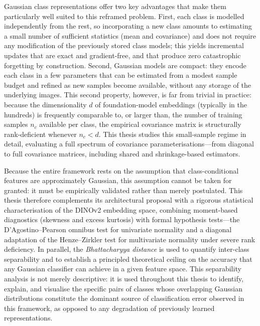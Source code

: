 Gaussian class representations offer two key advantages that make them particularly well suited to this reframed problem. First, each class is modelled independently from the rest, so incorporating a new class amounts to estimating a small number of sufficient statistics (mean and covariance) and does not require any modification of the previously stored class models; this yields incremental updates that are exact and gradient-free, and that produce zero catastrophic forgetting by construction. Second, Gaussian models are compact: they encode each class in a few parameters that can be estimated from a modest sample budget and refined as new samples become available, without any storage of the underlying images. This second property, however, is far from trivial in practice: because the dimensionality $d$ of foundation-model embeddings (typically in the hundreds) is frequently comparable to, or larger than, the number of training samples $n_c$ available per class, the empirical covariance matrix is structurally rank-deficient whenever $n_c < d$. This thesis studies this small-sample regime in detail, evaluating a full spectrum of covariance parameterisations---from diagonal to full covariance matrices, including shared and shrinkage-based estimators.

Because the entire framework rests on the assumption that class-conditional features are approximately Gaussian, this assumption cannot be taken for granted: it must be empirically validated rather than merely postulated. This thesis therefore complements its architectural proposal with a rigorous statistical characterisation of the DINOv2 embedding space, combining moment-based diagnostics (skewness and excess kurtosis) with formal hypothesis tests---the D'Agostino--Pearson omnibus test \cite{dagostino1971omnibus,dagostino1973tests} for univariate normality and a diagonal adaptation of the Henze--Zirkler test \cite{henze1990class} for multivariate normality under severe rank deficiency. In parallel, the \emph{Bhattacharyya distance} is used to quantify inter-class separability and to establish a principled theoretical ceiling on the accuracy that any Gaussian classifier can achieve in a given feature space. This separability analysis is not merely descriptive: it is used throughout this thesis to identify, explain, and visualise the specific pairs of classes whose overlapping Gaussian distributions constitute the dominant source of classification error observed in this framework, as opposed to any degradation of previously learned representations.

